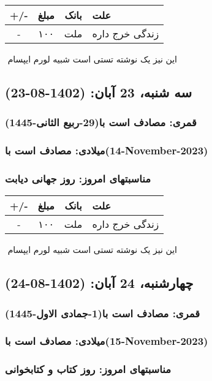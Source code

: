 \documentclass{article}
\newcommand{\rnote}[1]{\marginpar{\textcolor{color}{\StrSubstitute{\##1}{ }{\_}}}}
\newcommand{\myRow}[4]{
    #1 & #2 & #3 & #4 \\ \hline
}
\begin{document}
\begin{tabular}{ | c | c | c | p{5cm} |}
    \hline
    \myRow{ +/- }{مبلغ}{بانک}{علت}
    \myRow{-}{۱۰۰}{ملت}{زندگی خرج داره}
\end{tabular}
\newline
\newline

‌
\rnote{تست}
این نیز یک نوشته تستی است شبیه لورم ایپسام




\newpage
{}
\textcolor{color}{
\section{ سه شنبه، 23 آبان: (1402-08-23) }
\subsubsection*{قمری: مصادف است با(29-ربیع الثانی-1445)} 
\subsubsection*{میلادی: مصادف است با(14-November-2023)}
\subsubsection*{مناسبتهای امروز: روز جهانی دیابت}
}


\begin{tabular}{ | c | c | c | p{5cm} |}
    \hline
    \myRow{ +/- }{مبلغ}{بانک}{علت}
    \myRow{-}{۱۰۰}{ملت}{زندگی خرج داره}
\end{tabular}
\newline
\newline

‌
\rnote{تست}
این نیز یک نوشته تستی است شبیه لورم ایپسام




\newpage
{}
\textcolor{color}{
\section{ چهارشنبه، 24 آبان: (1402-08-24) }
\subsubsection*{قمری: مصادف است با(1-جمادی الاول-1445)} 
\subsubsection*{میلادی: مصادف است با(15-November-2023)}
\subsubsection*{مناسبتهای امروز: روز کتاب و کتابخوانی}
}
\end{document}
